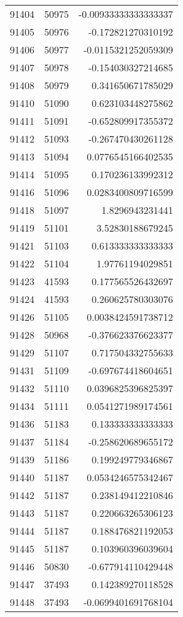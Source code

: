 \begin{tabular}{r | r | r}
91404 & 50975 & -0.00933333333333337 \\
91405 & 50976 & -0.172821270310192 \\
91406 & 50977 & -0.0115321252059309 \\
91407 & 50978 & -0.154030327214685 \\
91408 & 50979 & 0.341650671785029 \\
91410 & 51090 & 0.623103448275862 \\
91411 & 51091 & -0.652809917355372 \\
91412 & 51093 & -0.267470430261128 \\
91413 & 51094 & 0.0776545166402535 \\
91414 & 51095 & 0.170236133992312 \\
91416 & 51096 & 0.0283400809716599 \\
91418 & 51097 & 1.8296943231441 \\
91419 & 51101 & 3.52830188679245 \\
91421 & 51103 & 0.613333333333333 \\
91422 & 51104 & 1.97761194029851 \\
91423 & 41593 & 0.177565526432697 \\
91424 & 41593 & 0.260625780303076 \\
91426 & 51105 & 0.0038424591738712 \\
91428 & 50968 & -0.376623376623377 \\
91429 & 51107 & 0.717504332755633 \\
91431 & 51109 & -0.697674418604651 \\
91432 & 51110 & 0.0396825396825397 \\
91434 & 51111 & 0.0541271989174561 \\
91436 & 51183 & 0.133333333333333 \\
91437 & 51184 & -0.258620689655172 \\
91439 & 51186 & 0.199249779346867 \\
91440 & 51187 & 0.0534246575342467 \\
91442 & 51187 & 0.238149412210846 \\
91443 & 51187 & 0.220663265306123 \\
91444 & 51187 & 0.188476821192053 \\
91445 & 51187 & 0.103960396039604 \\
91446 & 50830 & -0.677914110429448 \\
91447 & 37493 & 0.142389270118528 \\
91448 & 37493 & -0.0699401691768104 \\

\end{tabular}
